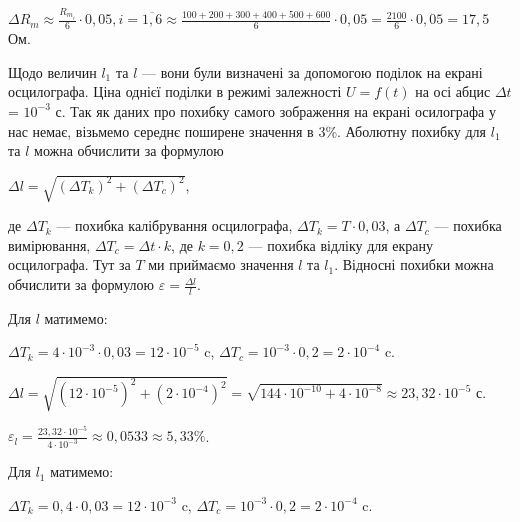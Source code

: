 \documentclass[12pt,a4paper]{article}
\begin{document}
    \vspace{1em} %
    \setlength{\parindent}{0pt}

    $\displaystyle \Delta R_m \approx \frac{R_{m_i}}{6} \cdot 0,05, i = \overline{1, 6} \approx \frac{100 + 200 + 300 + 400 + 500 + 600}{6} \cdot 0,05 = \frac{2100}{6} \cdot 0,05 = 17,5$ Ом.

    \setlength{\parindent}{1.5em}

    Щодо величин $l_1$ та $l$ --- вони були визначені за допомогою поділок на екрані осцилографа. Ціна однієї поділки в режимі залежності $U = f(t)$ на осі абцис $\Delta t$ = $10^{-3}$ с. Так як даних про похибку
    самого зображення на екрані осилографа у нас немає, візьмемо середнє поширене значення в 3\%. Аболютну похибку для $l_1$ та $l$ можна обчислити за формулою

    \begin{center}
        $\displaystyle \Delta l = \sqrt{(\Delta T_k)^2 + (\Delta T_c)^2}$,
    \end{center}

    де $\Delta T_k$ --- похибка калібрування осцилографа, $\Delta T_k = T \cdot 0,03$, а $\Delta T_c$ --- похибка вимірювання, $\Delta T_c = \Delta t \cdot k$, де $k = 0,2$ --- похибка відліку для екрану осцилографа.
    Тут за $T$ ми приймаємо значення $l$ та $l_1$. Відносні похибки можна обчислити за формулою $\displaystyle \varepsilon = \frac{\Delta l}{l}$.

    Для $l$ матимемо:

    \vspace{1em} %

    $\displaystyle \Delta T_k = 4 \cdot 10^{-3} \cdot 0,03 = 12 \cdot 10^{-5}$ c, $\displaystyle \Delta T_c = 10^{-3} \cdot 0,2 = 2 \cdot 10^{-4}$ c.

    $\displaystyle \Delta l = \sqrt{\left( 12 \cdot 10^{-5}\right)^2 + \left(2 \cdot 10^{-4}\right)^2} = \sqrt{144 \cdot 10^{-10} + 4 \cdot 10^{-8}} \approx 23,32 \cdot 10^{-5}$ с.

    $\displaystyle \varepsilon_l = \frac{23,32 \cdot 10^{-5}}{4 \cdot 10^{-3}} \approx 0,0533 \approx 5,33\%$.

    \vspace{1em} %

    Для $l_1$ матимемо:

    \vspace{1em} %

    $\displaystyle \Delta T_k = 0,4 \cdot 0,03 = 12 \cdot 10^{-3}$ c, $\displaystyle \Delta T_c = 10^{-3} \cdot 0,2 = 2 \cdot 10^{-4}$ c.
\end{document}
